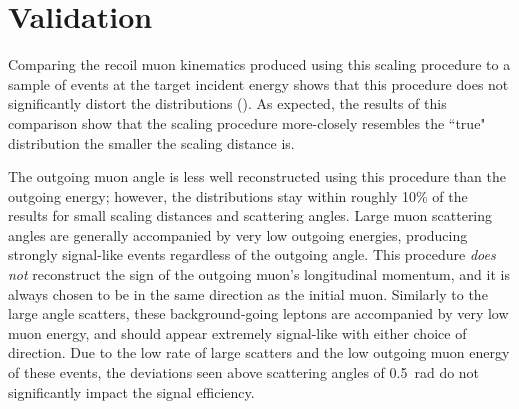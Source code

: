 \section{Validation}
\label{sec:validation}

Comparing the recoil muon kinematics produced using this scaling procedure to a sample of \mg events at the target incident energy shows that this procedure does not significantly distort the distributions ().
As expected, the results of this comparison show that the scaling procedure more-closely resembles the ``true" \mg distribution the smaller the scaling distance is.

The outgoing muon angle is less well reconstructed using this procedure than the outgoing energy; however, the distributions stay within roughly 10\% of the \mg results for small scaling distances and scattering angles.
Large muon scattering angles are generally accompanied by very low outgoing energies, producing strongly signal-like events regardless of the outgoing angle. 
This procedure \emph{does not} reconstruct the sign of the outgoing muon's longitudinal momentum, and it is always chosen to be in the same direction as the initial muon. 
Similarly to the large angle scatters, these background-going leptons are accompanied by very low muon energy, and should appear extremely signal-like with either choice of direction.
Due to the low rate of large scatters and the low outgoing muon energy of these events, the deviations seen above scattering angles of \SI{0.5}{\radian} do not significantly impact the signal efficiency.


